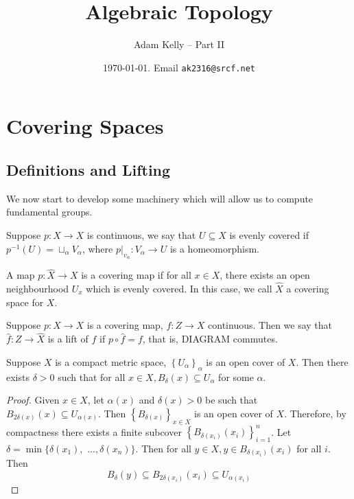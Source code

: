 \documentclass[a4paper, 10pt, twocolumn]{amsart}
\title{Algebraic Topology}
\author{Adam Kelly -- Part II}
\date{\today. Email \texttt{ak2316@srcf.net}}
\begin{document}
\maketitle

\section{Covering Spaces}

\subsection{Definitions and Lifting}

We now start to develop some machinery which will allow us to compute fundamental groups.

\begin{definition}
Suppose $p: \hat{X} \rightarrow X$ is continuous, we say that $U \subseteq X$ is evenly covered if $p^{-1}(U)=\sqcup_\alpha V_\alpha$, where $\left.p\right|_{v_\alpha}: V_\alpha \rightarrow U$ is a homeomorphism.
\end{definition}

\begin{definition}
  A map $p: \hat{X} \rightarrow X$ is a covering map if for all $x \in X$, there exists an open neighbourhood $U_x$ which is evenly covered. In this case, we call $\hat{X}$ a covering space for $X$.
\end{definition}

\begin{definition}[Lift]
  Suppose $p: \hat{X} \rightarrow X$ is a covering map, $f: Z \rightarrow X$ continuous. Then we say that $\hat{f}: Z \rightarrow \hat{X}$ is a lift of $f$ if $p \circ \hat{f}=f$, that is,
  {\color{red} DIAGRAM}
  commutes.
\end{definition}

\begin{lemma}
Suppose $X$ is a compact metric space, $\left\{U_\alpha\right\}_\alpha$ is an open cover of $X$. Then there exists $\delta>0$ such that for all $x \in X, B_\delta(x) \subseteq U_\alpha$ for some $\alpha$.
\end{lemma}
\begin{proof}
  Given $x \in X$, let $\alpha(x)$ and $\delta(x)>0$ be such that $B_{2 \delta(x)}(x) \subseteq U_{\alpha(x)}$. Then $\left\{B_{\delta(x)}\right\}_{x \in X}$ is an open cover of $X$. Therefore, by compactness there exists a finite subcover $\left\{B_{\delta\left(x_i\right)}\left(x_i\right)\right\}_{i=1}^n$. Let $\delta=\min \{\delta\left(x_1\right),$ $\ldots, \delta\left(x_n\right)\}$. Then for all $y \in X, y \in B_{\delta\left(x_i\right)}\left(x_i\right)$ for all $i$. Then
  $$
  B_\delta(y) \subseteq B_{2 \delta\left(x_i\right)}\left(x_i\right) \subseteq U_{\alpha\left(x_i\right)}
  $$
\end{proof}
\end{document}
